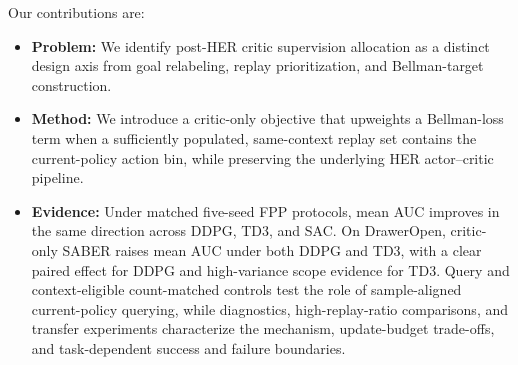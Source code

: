 \documentclass[letterpaper]{article}
\begin{document}
Our contributions are:
\begin{itemize}
    \item \textbf{Problem:} We identify post-HER critic supervision allocation as a distinct design axis from goal relabeling, replay prioritization, and Bellman-target construction.
    \item \textbf{Method:} We introduce a critic-only objective that upweights a Bellman-loss term when a sufficiently populated, same-context replay set contains the current-policy action bin, while preserving the underlying HER actor--critic pipeline.
    \item \textbf{Evidence:} Under matched five-seed FPP protocols, mean AUC improves in the same direction across DDPG, TD3, and SAC. On DrawerOpen, critic-only SABER raises mean AUC under both DDPG and TD3, with a clear paired effect for DDPG and high-variance scope evidence for TD3. Query and context-eligible count-matched controls test the role of sample-aligned current-policy querying, while diagnostics, high-replay-ratio comparisons, and transfer experiments characterize the mechanism, update-budget trade-offs, and task-dependent success and failure boundaries.
\end{itemize}
\end{document}
